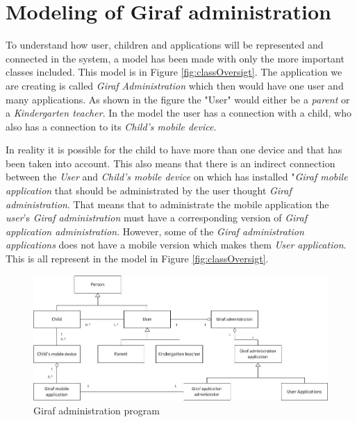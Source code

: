 \section{Modeling of Giraf administration}
To understand how user, children and applications will be represented and connected in the system, a model  has been made with only the more important classes included. This model is in Figure \vref{fig:classOversigt}. The application we are creating is called \textit{Giraf Administration} which then would have one user and many applications. As shown in the figure the "User" would either be a \textit{parent} or a \textit{Kindergarten teacher}. In the model the user has a connection with a child, who also has a connection to its \textit{Child's mobile device}.

In reality it is possible for the child to have more than one device and that has been taken into account. This also means that there is an indirect connection between the \textit{User} and \textit{Child's mobile device} on which has installed "\textit{Giraf mobile application} that should be administrated by the user thought \textit{Giraf administration}. That means that to administrate the mobile application the \textit{user}'s \textit{Giraf administration} must have a corresponding version of \textit{Giraf application administration}. However, some of the \textit{Giraf administration applications} does not have a mobile version which makes them \textit{User application}. This is all represent in the model in Figure \vref{fig:classOversigt}.


\begin{figure}[!ht]
	\centering
		\includegraphics[width=1.00\textwidth]{img/classOversigt.jpg}
	\caption{Giraf administration program}
	\label{fig:classOversigt}
\end{figure}
